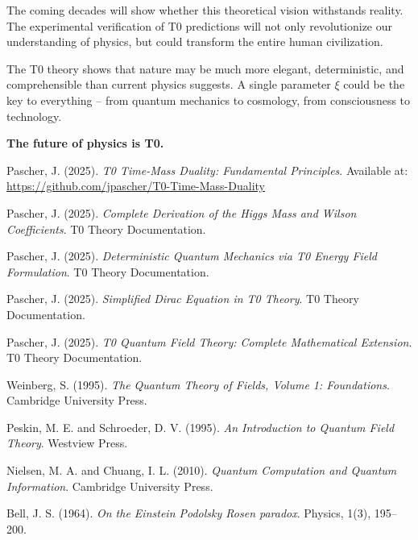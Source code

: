 \documentclass[12pt,a4paper]{article}
\begin{document}
	The coming decades will show whether this theoretical vision withstands reality. The experimental verification of T0 predictions will not only revolutionize our understanding of physics, but could transform the entire human civilization.
	
	\begin{tcolorbox}[colback=orange!5!white,colframe=orange!75!black,title={Closing Remarks}]
		The T0 theory shows that nature may be much more elegant, deterministic, and comprehensible than current physics suggests. A single parameter $\xi$ could be the key to everything – from quantum mechanics to cosmology, from consciousness to technology.
		
		\textbf{The future of physics is T0.}
	\end{tcolorbox}
	
	\begin{thebibliography}{99}
		
		Pascher, J. (2025). \textit{T0 Time-Mass Duality: Fundamental Principles}. 
		Available at: \url{https://github.com/jpascher/T0-Time-Mass-Duality}
		
		Pascher, J. (2025). \textit{Complete Derivation of the Higgs Mass and Wilson Coefficients}. 
		T0 Theory Documentation.
		
		Pascher, J. (2025). \textit{Deterministic Quantum Mechanics via T0 Energy Field Formulation}. 
		T0 Theory Documentation.
		
		Pascher, J. (2025). \textit{Simplified Dirac Equation in T0 Theory}. 
		T0 Theory Documentation.
		
		Pascher, J. (2025). \textit{T0 Quantum Field Theory: Complete Mathematical Extension}. 
		T0 Theory Documentation.
		
		Weinberg, S. (1995). \textit{The Quantum Theory of Fields, Volume 1: Foundations}. 
		Cambridge University Press.
		
		Peskin, M. E. and Schroeder, D. V. (1995). \textit{An Introduction to Quantum Field Theory}. 
		Westview Press.
		
		Nielsen, M. A. and Chuang, I. L. (2010). \textit{Quantum Computation and Quantum Information}. 
		Cambridge University Press.
		
		Bell, J. S. (1964). \textit{On the Einstein Podolsky Rosen paradox}. 
		Physics, 1(3), 195--200.
		

\end{thebibliography}
\end{document}
